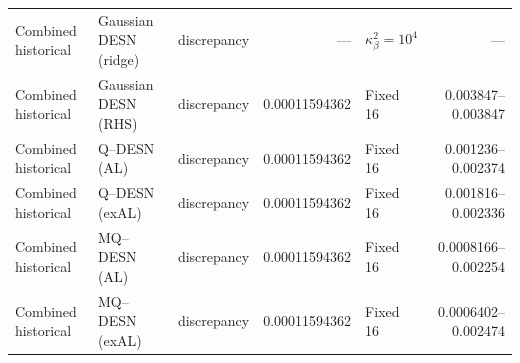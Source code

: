 {\begin{tabular}{@{}lllrlr@{}}
Combined historical & Gaussian DESN (ridge) & discrepancy & --- & $\kappa_\beta^2=10^4$ & --- \\
Combined historical & Gaussian DESN (RHS) & discrepancy & 0.00011594362 & Fixed 16 & 0.003847--0.003847 \\
Combined historical & Q--DESN (AL) & discrepancy & 0.00011594362 & Fixed 16 & 0.001236--0.002374 \\
Combined historical & Q--DESN (exAL) & discrepancy & 0.00011594362 & Fixed 16 & 0.001816--0.002336 \\
Combined historical & MQ--DESN (AL) & discrepancy & 0.00011594362 & Fixed 16 & 0.0008166--0.002254 \\
Combined historical & MQ--DESN (exAL) & discrepancy & 0.00011594362 & Fixed 16 & 0.0006402--0.002474 \\
\bottomrule
\end{tabular}%
}
